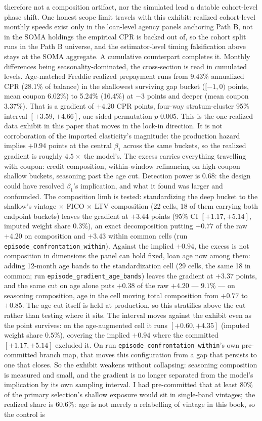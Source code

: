 \documentclass[12pt]{article}
\begin{document}
therefore not a composition artifact, nor the simulated lead a datable cohort-level phase shift. One honest scope limit travels with this exhibit: realized cohort-level monthly speeds exist only in the loan-level agency panels anchoring Path B, not in the SOMA holdings the empirical CPR is backed out of, so the cohort split runs in the Path B universe, and the estimator-level timing falsification above stays at the SOMA aggregate. A cumulative counterpart completes it. Monthly differences being seasonality-dominated, the cross-section is read in cumulated levels. Age-matched Freddie realized prepayment runs from 9.43\% annualized CPR (28.1\% of balance) in the shallowest surviving gap bucket ($[-1,0)$ points, mean coupon 6.02\%) to 5.24\% (16.4\%) at $-3$ points and deeper (mean coupon 3.37\%). That is a gradient of $+4.20$ CPR points, four-way stratum-cluster 95\% interval $[+3.59, +4.66]$, one-sided permutation $p$ 0.005. This is the one realized-data exhibit in this paper that moves in the lock-in direction. It is not corroboration of the imported elasticity's magnitude: the production hazard implies $+0.94$ points at the central $\beta_1$ across the same buckets, so the realized gradient is roughly $4.5\times$ the model's. The excess carries everything travelling with coupon: credit composition, within-window refinancing on high-coupon shallow buckets, seasoning past the age cut. Detection power is 0.68: the design could have resolved $\beta_1$'s implication, and what it found was larger and confounded. The composition limb is tested: standardizing the deep bucket to the shallow's vintage $\times$ FICO $\times$ LTV composition (22 cells, 18 of them carrying both endpoint buckets) leaves the gradient at $+3.44$ points (95\% CI $[+1.17, +5.14]$, imputed weight share $0.3\%$), an exact decomposition putting $+0.77$ of the raw $+4.20$ on composition and $+3.43$ within common cells (run \texttt{episode\_confrontation\_within}). Against the implied $+0.94$, the excess is not composition in dimensions the panel can hold fixed, loan age now among them: adding 12-month age bands to the standardization cell (29 cells, the same 18 in common; run \texttt{episode\_gradient\_age\_bands}) leaves the gradient at $+3.37$ points, and the same cut on age alone puts $+0.38$ of the raw $+4.20$ --- $9.1\%$ --- on seasoning composition, age in the cell moving total composition from $+0.77$ to $+0.85$. The age cut itself is held at production, so this stratifies above the cut rather than testing where it sits. The interval moves against the exhibit even as the point survives: on the age-augmented cell it runs $[+0.60, +4.35]$ (imputed weight share $0.5\%$), covering the implied $+0.94$ where the committed $[+1.17, +5.14]$ excluded it. On run \texttt{episode\_confrontation\_within}'s own pre-committed branch map, that moves this configuration from a gap that persists to one that closes. So the exhibit weakens without collapsing: seasoning composition is measured and small, and the gradient is no longer separated from the model's implication by its own sampling interval. I had pre-committed that at least $80\%$ of the primary selection's shallow exposure would sit in single-band vintages; the realized share is $60.6\%$: age is not merely a relabelling of vintage in this book, so the control is 
\end{document}
